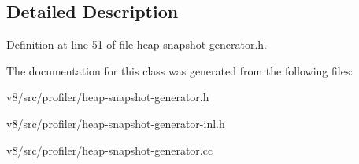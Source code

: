 \subsection{Detailed Description}


Definition at line 51 of file heap-\/snapshot-\/generator.\+h.



The documentation for this class was generated from the following files\+:\begin{DoxyCompactItemize}
\item 
v8/src/profiler/heap-\/snapshot-\/generator.\+h\item 
v8/src/profiler/heap-\/snapshot-\/generator-\/inl.\+h\item 
v8/src/profiler/heap-\/snapshot-\/generator.\+cc\end{DoxyCompactItemize}
